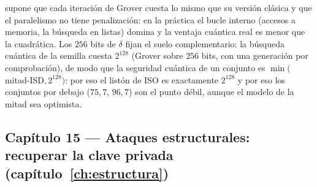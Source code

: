 \begin{enumerate}[leftmargin=1.9em,itemsep=4pt]
        supone que cada iteración de Grover cuesta lo mismo que su
        versión clásica y que el paralelismo no tiene penalización:
        en la práctica el bucle interno (accesos a memoria, la
        búsqueda en listas) domina y la ventaja cuántica real es
        menor que la cuadrática. Los $256$ bits de $\delta$ fijan
        el suelo complementario: la búsqueda cuántica de la semilla
        cuesta $2^{128}$ (Grover sobre $256$ bits, con una
        generación por comprobación), de modo que la seguridad
        cuántica de un conjunto es $\min($mitad-ISD$,2^{128})$: por
        eso el listón de ISO es exactamente $2^{128}$ y por eso los
        conjuntos por debajo ($75{,}7$, $96{,}7$) son el punto
        débil, aunque el modelo de la mitad sea optimista.
\end{enumerate}

\subsection*{Capítulo 15 --- Ataques estructurales: recuperar la
clave privada (capítulo~\ref{ch:estructura})}

